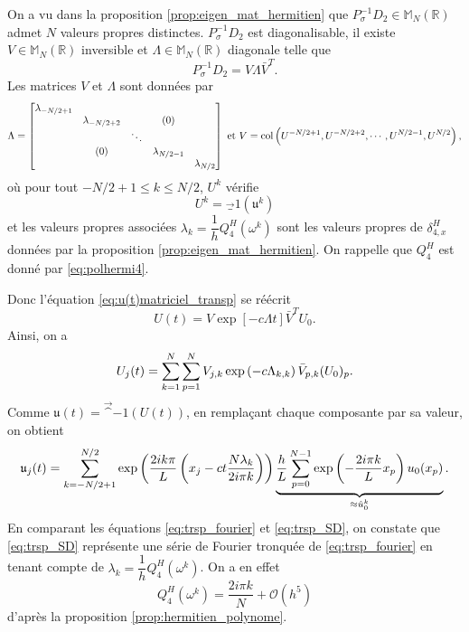 On a vu dans la proposition \ref{prop:eigen_mat_hermitien} que $P^{-1}_{\sigma} D_2 \in \mathbb{M}_N(\mathbb{R})$ admet $N$ valeurs propres distinctes. $P^{-1}_{\sigma} D_2$ est diagonalisable, il existe $V\in \mathbb{M}_N(\mathbb{R})$ inversible et $\Lambda \in \mathbb{M}_N(\mathbb{R})$ diagonale telle que
\begin{equation}
P^{-1}_{\sigma} D_2 = V \Lambda \bar{V}^T.
\end{equation}
Les matrices $V$ et $\Lambda$ sont données par 
\begin{equation}
\Lambda = \begin{bmatrix}
\lambda_{-N/2+1} &   &   &   &   \\ 
  & \lambda_{-N/2+2} &   & (0) &   \\ 
  &   & \ddots &   &   \\ 
  & (0) &   & \lambda_{N/2-1} &   \\ 
  &   &   &   & \lambda_{N/2}
\end{bmatrix} \text{ et }
V = \text{col} \left( U^{-N/2+1}, U^{-N/2+2}, \cdots, U^{N/2-1}, U^{N/2} \right),
\label{eq:matrice_diagonalisation}
\end{equation}
où pour tout $-N/2+1 \leq k \leq N/2$, $U^k$ vérifie
\begin{equation}
U^k = \vec_1 ( \mathfrak{u}^k )
\end{equation} 
et les valeurs propres associées $\lambda_k = \dfrac{1}{h}Q_{4}^H(\omega^k)$ sont les valeurs propres de $\delta_{4,x}^H$ données par la proposition \ref{prop:eigen_mat_hermitien}. On rappelle que $Q_4^H$  est donné par \eqref{eq:polhermi4}.

Donc l'équation \eqref{eq:u(t)matriciel_transp} se réécrit
\begin{equation}
U(t) = V \exp \left[-c \Lambda t \right] \bar{V}^T U_0.
\end{equation}
Ainsi, on a
\begin{equation}
U_j(t) = \displaystyle\sum\limits_{k=1}^{N} \displaystyle\sum\limits_{p=1}^N V_{j,k} \exp \left( - c \Lambda_{k,k}  \right)  \bar{V}_{p,k}(U_0)_p.
\end{equation}
Comme $\mathfrak{u}(t) = \vec^{-1}(U(t))$, en remplaçant chaque composante par sa valeur, on obtient
\begin{equation}
\mathfrak{u}_j(t) = \displaystyle\sum\limits_{k=-N/2+1}^{N/2} \exp \left( \dfrac{2 i k \pi}{L} \left( x_j - ct \dfrac{N \lambda_k}{2 i \pi k} \right) \right) \underbrace{\dfrac{h}{L} \displaystyle\sum\limits_{p=0}^{N-1} \exp \left( - \dfrac{2 i \pi k}{L} x_p \right) u_0(x_p)}_{ \approx \hat{u}^k_0}.
\label{eq:trsp_SD}
\end{equation}
En comparant les équations \eqref{eq:trsp_fourier} et \eqref{eq:trsp_SD}, on constate que \eqref{eq:trsp_SD} représente une série de Fourier tronquée de \eqref{eq:trsp_fourier} en tenant compte de $\lambda_k = \dfrac{1}{h}Q_4^H(\omega^k)$. On a en effet
\begin{equation}
Q_4^H(\omega^k) = \dfrac{2 i \pi k}{N} + \mathcal{O} \left( h^5 \right)
\end{equation}
d'après la proposition \ref{prop:hermitien_polynome}.

